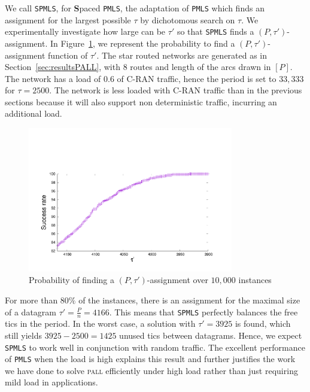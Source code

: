 \documentclass[a4paper,10pt]{journal}
\newcommand\PMLS{\texttt{PMLS}\xspace}
\newcommand\SPMLS{\texttt{SPMLS}\xspace}
\newcommand\pall{\textsc{pall}\xspace}
\begin{document}
    We call \SPMLS, for \textbf{S}paced \PMLS, the adaptation of \PMLS which finds an assignment for the largest possible $\tau$ by dichotomous search on $\tau$. We experimentally investigate how large can be $\tau'$ so that \SPMLS finds a $(P,\tau')$-assignment. In Figure~\ref{fig:spacetau}, we represent the probability to find a $(P,\tau')$-assignment function of $\tau'$. The star routed networks are generated as in Section~\ref{sec:resultsPALL}, with $8$ routes and length of the arcs drawn in $[P]$. The network has a load of $0.6$ of C-RAN traffic, hence the period is set to $33,333$ for $\tau = 2500$. The network is less loaded with C-RAN traffic than in the previous sections because it will also support non deterministic traffic, incurring an additional load.

    \begin{figure}
       \begin{center}
      \includegraphics[width = 0.8\textwidth]{distribtau.pdf}
      \end{center}
      \caption{Probability of finding a $(P,\tau')$-assignment over $10,000$ instances}
      \label{fig:spacetau}   
     \end{figure}   

	For more than $80\%$ of the instances, there is an assignment for the maximal size of a datagram $\tau' = \frac{P}{n} = 4166$. This means that \SPMLS perfectly balances the free tics in the period. In the worst case, a solution with $\tau' = 3925$ is found, which still yields $3925 - 2500 = 1425$ unused tics between datagrams. Hence, we expect \SPMLS to work well in conjunction with random traffic.
	The excellent performance of \PMLS when the load is high explains this result and further justifies the work we have done to solve \pall efficiently under high load rather than just requiring mild load in applications. 
\end{document}
